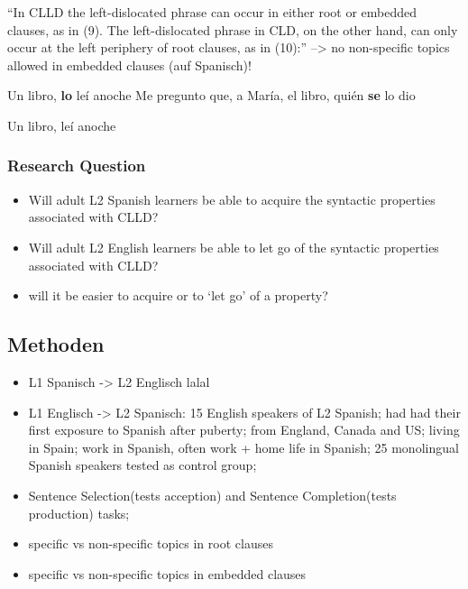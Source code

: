 ``In CLLD the left-dislocated phrase can occur in either root or embedded clauses, as in (9). The left-dislocated phrase in CLD, on the other hand, can only occur at the left periphery of root clauses, as in (10):''
--> no non-specific topics allowed in embedded clauses (auf Spanisch)!
\begin{exe}
    \ex \begin{xlist}
        \ex Un libro, \textbf{lo} leí anoche
        \ex Me pregunto que, a María, el libro, quién \textbf{se} lo dio
        \end{xlist}
    \ex \begin{xlist}
        \ex Un libro, leí anoche
        \end{xlist}
\end{exe}

\subsubsection{Research Question}
\begin{itemize}
    \item Will adult L2 Spanish learners be able to acquire the syntactic properties associated with CLLD?
    \item Will adult L2 English learners be able to let go of the syntactic properties associated with CLLD?
    \item will it be easier to acquire or to ‘let go’ of a property?
\end{itemize}

\subsection{Methoden}

\begin{itemize}
    \item L1 Spanisch -> L2 Englisch lalal
    \item L1 Englisch -> L2 Spanisch: 15 English speakers of L2 Spanish; had had their first exposure to Spanish after puberty;
        from England, Canada and US; living in Spain; work in Spanish, often work + home life in Spanish;
        25 monolingual Spanish speakers tested as control group;
    \item Sentence Selection(tests acception) and Sentence Completion(tests production) tasks;
    \item specific vs non-specific topics in root clauses
    \item specific vs non-specific topics in embedded clauses
\end{itemize}

